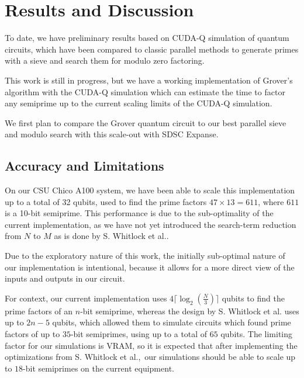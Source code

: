 \documentclass[twocolumn]{cinc}
\begin{document}
\section{Results and Discussion}

To date, we have preliminary results based on CUDA-Q simulation of quantum circuits, 
which have been compared to classic parallel methods to generate primes with a sieve 
and search them for modulo zero factoring. 

This work is still in progress, but we have a working implementation of Grover's 
algorithm with the CUDA-Q simulation which can estimate the time to factor any 
semiprime up to the current scaling limits of the CUDA-Q simulation. 

We first plan to compare the Grover quantum circuit to our best parallel sieve 
and modulo search with this scale-out with SDSC Expanse.

  \subsection{Accuracy and Limitations}

  On our CSU Chico A100 system, 
  we have been able to scale this implementation up to a total of 32 qubits,
  used to find the prime factors $47\times13=611$, where $611$ is a 10-bit semiprime. This
  performance is due to the sub-optimality of the current implementation, as we have
  not yet introduced the search-term reduction from $N$ to $M$ as is done by S. Whitlock 
  et al.\cite{quantum_factoring}. 

  Due to the exploratory nature of this work, the initially sub-optimal nature of our 
  implementation is intentional, because it allows for a more direct view of the inputs
  and outputs in our circuit.

  For context, our current implementation uses $4 \lceil \log_2(\frac{N}{3})\rceil$ qubits
  to find the prime factors of an $n$-bit semiprime, whereas the design by S. Whitlock 
  et al.\cite{quantum_factoring} uses up to $2n-5$ qubits, which allowed them to simulate circuits which found
  prime factors of up to $35$-bit semiprimes, using up to a total of $65$ qubits. 
  The limiting factor for our simulations is VRAM, so it is expected that after implementing 
  the optimizations from S. Whitlock et al.,\ our simulations should be able to scale up to 
  $18$-bit semiprimes on the current equipment.

\end{document}
